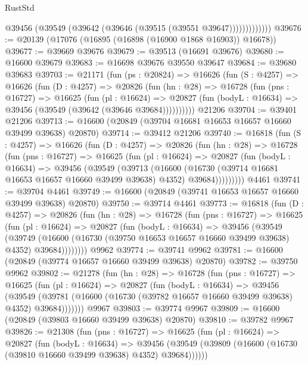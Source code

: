 \begin{lexlean}{RustStd}
\begin{coremodule}
{\begin{coremodule}
{{{{{{{{{{{{{{{{{{{{{{{{{{{{{{{{{{{{{{{{{{{{{{{{{{{{{{{                  @39456 (@39549 (@39642 (@39646 (@39515 (@39551 @39647)))))))))))))
@39676 := @20139 (@17076 (@16895 (@16898 (@16900 @1868 @16903)) @16678))
@39677 := @39669 @39676
@39679 := @39513 (@16691 @39676)
@39680 := @16600 @39679
@39683 := @16698 @39676 @39550 @39647
@39684 := @39680 @39683
@39703 := @21171
    (fun (ps : @20824) =>
    @16626
      (fun (S : @4257) =>
      @16626
        (fun (D : @4257) =>
        @20826
          (fun (hn : @28) =>
          @16728
            (fun (pns : @16727) =>
            @16625
              (fun (pl : @16624) =>
              @20827 (fun (bodyL : @16634) => @39456 (@39549 (@39642 (@39646 @39684))))))))))
    @21206
@39704 := @39401 @21206
@39713 := @16600 (@20849 (@39704 @16681 @16653 @16657 @16660 @39499 @39638) @20870)
@39714 := @39412 @21206
@39740 := @16818
    (fun (S : @4257) =>
    @16626
      (fun (D : @4257) =>
      @20826
        (fun (hn : @28) =>
        @16728
          (fun (pns : @16727) =>
          @16625
            (fun (pl : @16624) =>
            @20827
              (fun (bodyL : @16634) =>
              @39456
                (@39549
                  (@39713
                    (@16600
                      (@16730 (@39714 @16681 @16653 @16657 @16660 @39499 @39638) @4352)
                      @39684)))))))))
    @4461
@39741 := @39704 @4461
@39749 := @16600 (@20849 (@39741 @16653 @16657 @16660 @39499 @39638) @20870)
@39750 := @39714 @4461
@39773 := @16818
    (fun (D : @4257) =>
    @20826
      (fun (hn : @28) =>
      @16728
        (fun (pns : @16727) =>
        @16625
          (fun (pl : @16624) =>
          @20827
            (fun (bodyL : @16634) =>
            @39456
              (@39549
                (@39749
                  (@16600 (@16730 (@39750 @16653 @16657 @16660 @39499 @39638) @4352) @39684))))))))
    @9962
@39774 := @39741 @9962
@39781 := @16600 (@20849 (@39774 @16657 @16660 @39499 @39638) @20870)
@39782 := @39750 @9962
@39802 := @21278
    (fun (hn : @28) =>
    @16728
      (fun (pns : @16727) =>
      @16625
        (fun (pl : @16624) =>
        @20827
          (fun (bodyL : @16634) =>
          @39456
            (@39549
              (@39781 (@16600 (@16730 (@39782 @16657 @16660 @39499 @39638) @4352) @39684)))))))
    @9967
@39803 := @39774 @9967
@39809 := @16600 (@20849 (@39803 @16660 @39499 @39638) @20870)
@39810 := @39782 @9967
@39826 := @21308
    (fun (pns : @16727) =>
    @16625
      (fun (pl : @16624) =>
      @20827
        (fun (bodyL : @16634) =>
        @39456 (@39549 (@39809 (@16600 (@16730 (@39810 @16660 @39499 @39638) @4352) @39684))))))
}}}}}}}}}}}}}}}}}}}}}}}}}}}}}}}}}}}}}}}}}}}}}}}}}}}}}}}
\end{coremodule}}
\end{coremodule}
\end{lexlean}
